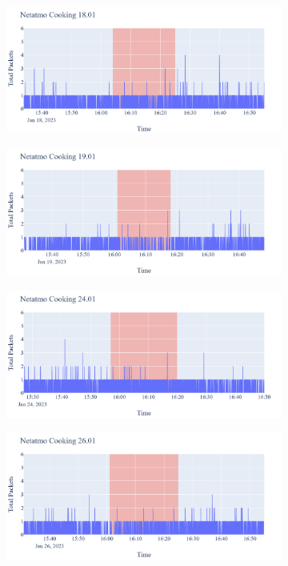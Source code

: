 \begin{figure}[H]
\begin{subfigure}[b]{0.47\textwidth}
        \centering
        \includegraphics[width=1.2\hsize]{figures/Netatmo_Cooking_Packets_18.01.png}
    \end{subfigure}
    \begin{subfigure}[b]{0.47\textwidth}
        \centering
        \includegraphics[width=1.2\hsize]{figures/Netatmo_Cooking_Packets_19.01.png}
    \end{subfigure}
    \begin{subfigure}[b]{0.47\textwidth}
        \centering
        \includegraphics[width=1.2\hsize]{figures/Netatmo_Cooking_Packets_24.01.png}
    \end{subfigure}
    \begin{subfigure}[b]{0.47\textwidth}
        \centering
        \includegraphics[width=1.2\hsize]{figures/Netatmo_Cooking_Packets_26.01.png}

\end{subfigure}
\end{figure}

